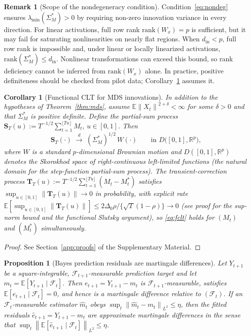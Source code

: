 \documentclass[bj,authoryear]{imsart}
\theoremstyle{plain}
\newtheorem{proposition}[theorem]{Proposition}
\newtheorem{corollary}[theorem]{Corollary}
\theoremstyle{definition}
\newtheorem{remark}{Remark}[section]
\newcommand{\E}{\mathbb{E}}
\newcommand{\R}{\mathbb{R}}
\newcommand{\F}{\mathcal{F}}
\newcommand{\norm}[1]{\left\lVert #1 \right\rVert}
\newcommand{\given}{\mid}
\begin{document}
\begin{remark}[Scope of the nondegeneracy condition]
\label{rem:rank}
Condition~\eqref{eq:nondeg} ensures
$\lambda_{\min}(\Sigma_M^*)>0$ by requiring non-zero innovation variance
in every direction.  For linear activations, full row rank
$\mathrm{rank}(W_x)=p$ is sufficient, but it may fail for saturating
nonlinearities on nearly flat regions.  When $d_{\mathrm{in}}<p$, full row
rank is impossible and, under linear or locally linearized activations,
$\mathrm{rank}(\Sigma_M^*)\leq d_{\mathrm{in}}$.  Nonlinear transformations
can exceed this bound, so rank deficiency cannot be inferred from
$\mathrm{rank}(W_x)$ alone.  In practice, positive definiteness should be
checked from pilot data; Corollary~\ref{cor:fclt} assumes it.
\end{remark}

\begin{corollary}[Functional CLT for MDS innovations]
\label{cor:fclt}
  In addition to the hypotheses of Theorem~\ref{thm:mds}, assume
  $\E\norm{X_t}^{2+\delta}<\infty$ for some $\delta>0$ and that
  $\Sigma_M^*$ is positive definite.  Define the partial-sum process
  $\mathbf{S}_T(u):=T^{-1/2}\sum_{t=1}^{\lfloor Tu\rfloor}M_t$,
  $u\in[0,1]$.  Then
  \begin{equation}
    \mathbf{S}_T(\cdot)
    \;\xrightarrow{d}\;
    (\Sigma_M^*)^{1/2}\,W(\cdot)
    \qquad \text{in } D\bigl([0,1],\R^p\bigr),
    \label{eq:fclt}
  \end{equation}
  where $W$ is a standard $p$-dimensional Brownian motion and
  $D([0,1],\R^p)$ denotes the Skorokhod space of right-continuous
  left-limited functions (the natural domain for the step-function
  partial-sum process).
  The transient-correction process
  $\mathbf{T}_T(u):=T^{-1/2}\sum_{t=1}^{\lfloor Tu\rfloor}(M_t-M_t^*)$
  satisfies $\sup_{u\in[0,1]}\|\mathbf{T}_T(u)\|\to 0$ in probability,
  with explicit rate
  $\E[\sup_{u\in[0,1]}\|\mathbf{T}_T(u)\|]\leq 2\Delta_0\rho/\{\sqrt{T}(1-\rho)\}\to0$
  (see proof for the sup-norm bound and the functional Slutsky argument),
  so \eqref{eq:fclt} holds for $(M_t)$ and $(M_t^*)$ simultaneously.
\end{corollary}

\begin{proof}
  See Section~\ref{app:proofs} of the Supplementary Material.
\end{proof}

\begin{proposition}[Bayes prediction residuals are martingale differences]
\label{prop:predresid}
  Let $Y_{t+1}$ be a square-integrable, $\F_{t+1}$-measurable prediction target and let
  $m_t=\E[Y_{t+1}\given\F_t]$.  Then $e_{t+1}=Y_{t+1}-m_t$
  is $\F_{t+1}$-measurable, satisfies $\E[e_{t+1}\given\F_t]=0$, and hence is a martingale difference relative to $(\F_t)$.  If an $\F_t$-measurable estimator
  $\hat m_t$ obeys $\sup_t\norm{\hat m_t-m_t}_{L^2}\leq\eta$, then the fitted
  residuals $\hat e_{t+1}=Y_{t+1}-\hat m_t$ are approximate martingale
  differences in the sense that
  $\sup_t\norm{\E[\hat e_{t+1}\given\F_t]}_{L^2}\leq\eta$.
\end{proposition}
\end{document}

